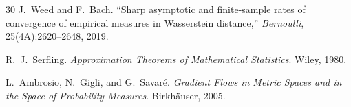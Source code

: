 \documentclass[12pt,a4paper]{article}
\begin{document}
\begin{thebibliography}{30}
J.~Weed and F.~Bach.
\newblock ``Sharp asymptotic and finite-sample rates of convergence of empirical
measures in Wasserstein distance,''
\newblock \emph{Bernoulli}, 25(4A):2620--2648, 2019.

R.~J.~Serfling.
\newblock \emph{Approximation Theorems of Mathematical Statistics}.
\newblock Wiley, 1980.

L.~Ambrosio, N.~Gigli, and G.~Savar\'e.
\newblock \emph{Gradient Flows in Metric Spaces and in the Space of Probability
Measures}.
\newblock Birkh\"auser, 2005.

\end{thebibliography}
\end{document}
